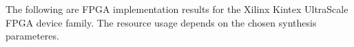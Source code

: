 \label{sec:ir}
The following are FPGA implementation results for the Xilinx Kintex UltraScale 
FPGA device family. The resource usage depends on the chosen synthesis
parameteres.



